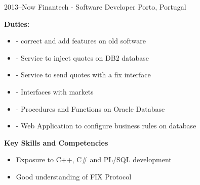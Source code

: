 \documentclass[]{friggeri-cv} %
\begin{document}
\begin{entrylist}


\entry
{2013--Now}
{Finantech - Software Developer}
{Porto, Portugal}
{
\textbf{Duties:}
\begin{itemize}
\item - correct and add features on old software
\item - Service to inject quotes on DB2 database
\item - Service to send quotes with a fix interface
\item - Interfaces with markets
\item - Procedures and Functions on Oracle Database
\item - Web Application to configure business rules on database
\end{itemize}

\textbf{Key Skills and Competencies}
\begin{itemize}
\item Exposure to C++, C\# and PL/SQL development
\item Good understanding of FIX Protocol
\end{itemize}
}




\end{entrylist}
\end{document}
